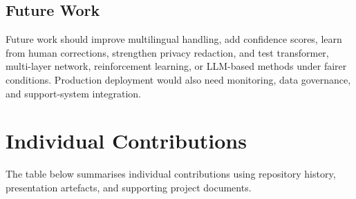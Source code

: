 \documentclass[11pt,a4paper]{article}
\begin{document}
\subsection{Future Work}
Future work should improve multilingual handling, add confidence scores, learn from human corrections, strengthen privacy redaction, and test transformer, multi-layer network, reinforcement learning, or LLM-based methods under fairer conditions. Production deployment would also need monitoring, data governance, and support-system integration.

\section{Individual Contributions}
The table below summarises individual contributions using repository history, presentation artefacts, and supporting project documents.
\end{document}
